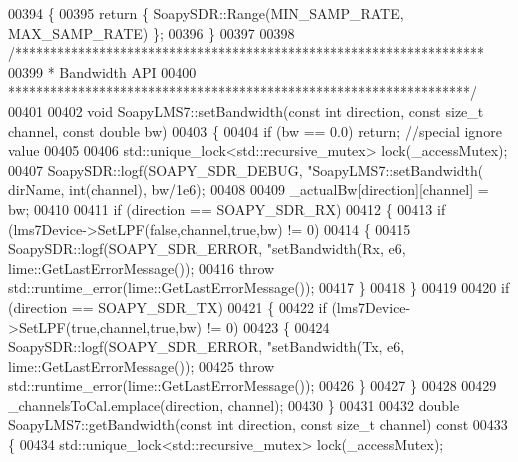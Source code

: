 \begin{DoxyCode}
{{{{{{{{{{{00394 \textcolor{keyword}{}\{
00395     \textcolor{keywordflow}{return} \{ SoapySDR::Range(MIN_SAMP_RATE, MAX_SAMP_RATE) \};
00396 \}
00397 
00398 \textcolor{comment}{/*******************************************************************}
00399 \textcolor{comment}{ * Bandwidth API}
00400 \textcolor{comment}{ ******************************************************************/}
00401 
00402 \textcolor{keywordtype}{void} SoapyLMS7::setBandwidth(\textcolor{keyword}{const} \textcolor{keywordtype}{int} direction, \textcolor{keyword}{const} \textcolor{keywordtype}{size\_t} channel, \textcolor{keyword}{const} \textcolor{keywordtype}{double} 
      bw)
00403 \{
00404     \textcolor{keywordflow}{if} (bw == 0.0) \textcolor{keywordflow}{return}; \textcolor{comment}{//special ignore value}
00405 
00406     std::unique\_lock<std::recursive\_mutex> lock(_accessMutex);
00407     SoapySDR::logf(SOAPY_SDR_DEBUG, \textcolor{stringliteral}{"SoapyLMS7::setBandwidth(%
      dirName, \textcolor{keywordtype}{int}(channel), bw/1e6);
00408 
00409     _actualBw[direction][channel] = bw;
00410 
00411     \textcolor{keywordflow}{if} (direction == SOAPY_SDR_RX)
00412     \{
00413         \textcolor{keywordflow}{if} (lms7Device->SetLPF(\textcolor{keyword}{false},channel,\textcolor{keyword}{true},bw) != 0)
00414         \{
00415             SoapySDR::logf(SOAPY_SDR_ERROR, \textcolor{stringliteral}{"setBandwidth(Rx, %
      e6, lime::GetLastErrorMessage());
00416             \textcolor{keywordflow}{throw} std::runtime\_error(lime::GetLastErrorMessage());
00417         \}
00418     \}
00419 
00420     \textcolor{keywordflow}{if} (direction == SOAPY_SDR_TX)
00421     \{
00422         \textcolor{keywordflow}{if} (lms7Device->SetLPF(\textcolor{keyword}{true},channel,\textcolor{keyword}{true},bw) != 0)
00423         \{
00424             SoapySDR::logf(SOAPY_SDR_ERROR, \textcolor{stringliteral}{"setBandwidth(Tx, %
      e6, lime::GetLastErrorMessage());
00425             \textcolor{keywordflow}{throw} std::runtime\_error(lime::GetLastErrorMessage());
00426         \}
00427     \}
00428 
00429     _channelsToCal.emplace(direction, channel);
00430 \}
00431 
00432 \textcolor{keywordtype}{double} SoapyLMS7::getBandwidth(\textcolor{keyword}{const} \textcolor{keywordtype}{int} direction, \textcolor{keyword}{const} \textcolor{keywordtype}{size\_t} channel)\textcolor{keyword}{ const}
00433 \textcolor{keyword}{}\{
00434     std::unique\_lock<std::recursive\_mutex> lock(_accessMutex);
}}}}}}}}}}}}}}
\end{DoxyCode}
